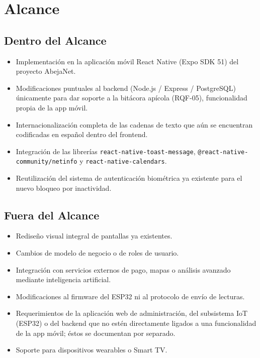 \clearpage
\section{Alcance}

\subsection{Dentro del Alcance}

\begin{itemize}[leftmargin=*]
  \item Implementación en la aplicación móvil React Native (Expo SDK 51) del proyecto AbejaNet.
  \item Modificaciones puntuales al backend (Node.js / Express / PostgreSQL) únicamente para dar soporte a la bitácora apícola (RQF-05), funcionalidad propia de la app móvil.
  \item Internacionalización completa de las cadenas de texto que aún se encuentran codificadas en español dentro del frontend.
  \item Integración de las librerías \texttt{react-native-toast-message}, \texttt{@react-native-community/netinfo} y \texttt{react-native-calendars}.
  \item Reutilización del sistema de autenticación biométrica ya existente para el nuevo bloqueo por inactividad.
\end{itemize}

\subsection{Fuera del Alcance}

\begin{itemize}[leftmargin=*]
  \item Rediseño visual integral de pantallas ya existentes.
  \item Cambios de modelo de negocio o de roles de usuario.
  \item Integración con servicios externos de pago, mapas o análisis avanzado mediante inteligencia artificial.
  \item Modificaciones al firmware del ESP32 ni al protocolo de envío de lecturas.
  \item Requerimientos de la aplicación web de administración, del subsistema IoT (ESP32) o del backend que no estén directamente ligados a una funcionalidad de la app móvil; éstos se documentan por separado.
  \item Soporte para dispositivos wearables o Smart TV.
\end{itemize}

